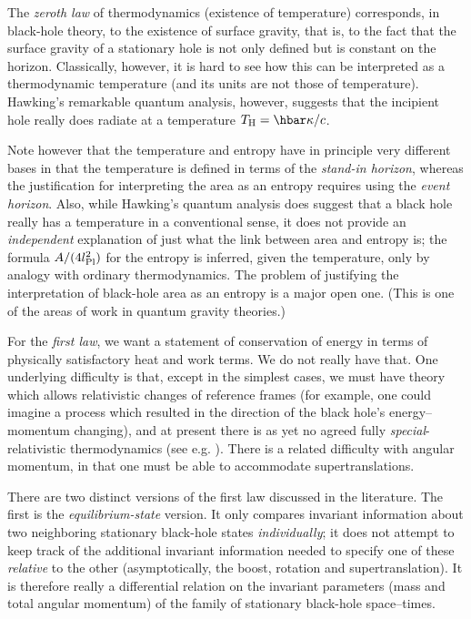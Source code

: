 \documentclass[
%
draft    %
,numberedheadings 
,bibliocites
  ]
  {aipproc}
\begin{document}
The {\em zeroth law} of thermodynamics (existence of temperature) corresponds, in black-hole theory, to the existence of surface gravity, that is, to the fact that the surface gravity of a stationary hole is not only defined but is constant on the horizon.
Classically, however, it is hard to see how this can be interpreted as a thermodynamic temperature (and its units are not those of temperature).  Hawking's remarkable quantum analysis, however, suggests that the incipient hole really does radiate at a temperature $T_{\rm H}=\hbar \kappa /c$.

Note however that the temperature and entropy
have in principle very
different bases in that the temperature is defined in terms of the {\em stand-in horizon}, whereas the justification for interpreting the area as an entropy requires using the {\em event horizon}.
Also, while Hawking's quantum analysis does suggest that a black hole really has a temperature in a conventional sense, it does not provide an {\em independent} explanation of just what the link between area and entropy is; the formula $A/(4l_{\rm Pl}^2)$ for the entropy is inferred, given the temperature, only by analogy with ordinary thermodynamics.  The problem of justifying the interpretation of black-hole area as an entropy is a major open one.  (This is one of the areas of work in quantum gravity theories.)


For the {\em first law}, we want a statement of conservation of energy in terms of physically satisfactory heat and work terms. 
We do not really have that.  One underlying difficulty is that, except in the simplest cases, we must have theory which allows relativistic changes of reference frames (for example, one could imagine a process which resulted in the direction of the black hole's energy--momentum changing), and
at present there is as yet no agreed fully 
{\em special}-relativistic thermodynamics (see e.g. \citep{DHH:2009}).  There is a related difficulty with angular momentum, in that one must be able to accommodate supertranslations.

There are two distinct versions of the first law discussed in the literature.  The first is the {\em equilibrium-state} version.  It only compares invariant information about two neighboring stationary black-hole states {\em individually}; it does not attempt to keep track of the additional invariant information needed to specify one of these {\em relative} to the other (asymptotically, the boost, rotation and supertranslation).  It is therefore really a differential relation on the invariant parameters (mass and total angular momentum) of the family of stationary black-hole space--times.
\end{document}
